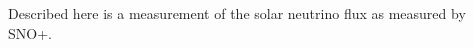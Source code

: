 

\begin{abstracts}

Described here is a measurement of the solar neutrino flux as measured by
SNO+.
\end{abstracts}

